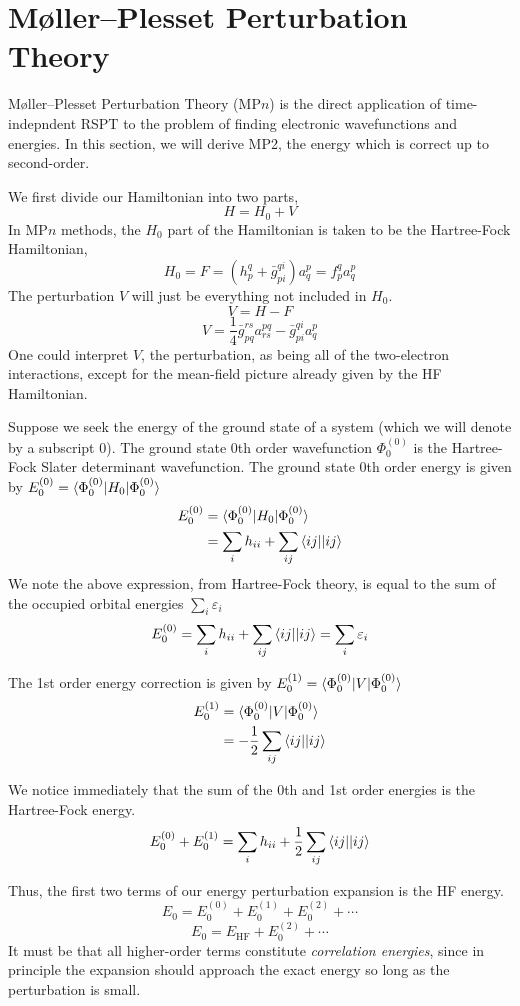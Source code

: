\documentclass{article}
\newcommand{\eps}{\varepsilon}
\begin{document}
\section{M{\o}ller--Plesset Perturbation Theory}
M{\o}ller--Plesset Perturbation Theory (MP$n$) is the direct application of time-indepndent RSPT to the problem of finding electronic wavefunctions and energies.
In this section, we will derive MP2, the energy which is correct up to second-order.

We first divide our Hamiltonian into two parts, 
\[H = H_0 + V \]
In MP$n$ methods, the $H_0$ part of the Hamiltonian is taken to be the Hartree-Fock Hamiltonian,
\[H_0 = F = (h_p^q + \bar{g}_{pi}^{qi}) a_q^p = f_p^q a_q^p  \]
The perturbation $V$ will just be everything not included in $H_0$. 
\[V = H - F \]
\[V =  \frac{1}{4} \bar{g}_{pq}^{rs} a_{rs}^{pq} - \bar{g}_{pi}^{qi} a_{q}^{p}  \]
One could interpret $V$, the perturbation, as being all of the two-electron interactions, except for the mean-field picture already given by the HF Hamiltonian.

Suppose we seek the energy of the ground state of a system (which we will denote by a subscript 0).
The ground state 0th order wavefunction $\Phi_0^{(0)}$ is the Hartree-Fock Slater determinant wavefunction. 
The ground state 0th order energy is given by $E_0^{(0)} = \braket{\Phi_0^{(0)} | H_0 | \Phi_0^{(0)}}$
\begin{align*}
E_0^{(0)} &= \braket{\Phi_0^{(0)} | H_0 | \Phi_0^{(0)}} \\
          &= \sum_i h_{ii} + \sum_{ij} \braket{ij||ij}  
\end{align*}
We note the above expression, from Hartree-Fock theory, is equal to the sum of the occupied orbital energies $\sum_i \eps_i$
\[E_0^{(0)} = \sum_i h_{ii} + \sum_{ij} \braket{ij||ij} = \sum_i \eps_i  \]

The 1st order energy correction is given by $E_0^{(1)} = \braket{\Phi_0^{(0)} | V | \Phi_0^{(0)}}$
\begin{align*}
E_0^{(1)} &= \braket{\Phi_0^{(0)} | V | \Phi_0^{(0)}} \\
          &= -\frac{1}{2} \sum_{ij} \braket{ij||ij} 
\end{align*}

We notice immediately that the sum of the 0th and 1st order energies is the Hartree-Fock energy.
\[ E_0^{(0)} + E_0^{(1)} = \sum_i h_{ii} + \frac{1}{2}\sum_{ij} \braket{ij||ij}   \] 

Thus, the first two terms of our energy perturbation expansion is the HF energy.
\[E_0 =  E_0^{(0)} +  E_0^{(1)} + E_0^{(2)} + \cdots \]
\[E_0 =  E_{\mathrm{HF}} + E_0^{(2)} + \cdots \]
It must be that all higher-order terms constitute \textit{correlation energies}, since in principle the expansion should approach the exact 
    energy so long as the perturbation is small.
\end{document}
